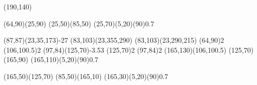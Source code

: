 \documentclass{standalone}
\begin{document}
\begin{axopicture}(190,140)

  \Line[arrow](64,90)(25,90)                               %
  \Line[arrow](25,50)(85,50)                               %
  \GOval(25,70)(5,20)(90){0.7}                             %
                                                           
  \PhotonArc(87,87)(23,35,173){-2}{7}                      %
  \Arc[arrow,clockwise,arrowpos=0.4](83,103)(23,355,290)   %
  \Arc[arrow,clockwise,arrowpos=0.4](83,103)(23,290,215)   %
  \Vertex(64,90){2}                                        %
  \Vertex(106,100.5){2}                                    %
  \Gluon(97,84)(125,70){-3.5}{3}                           %
  \Vertex(125,70){2}                                       %
  \Vertex(97,84){2}                                        %
  \Line[arrow](165,130)(106,100.5)                         %
  \Line[arrow](125,70)(165,90)                             %
  \GOval(165,110)(5,20)(90){0.7}                           %
                                                           
  \Line[arrow](165,50)(125,70)                             %
  \Line[arrow](85,50)(165,10)                              %
  \GOval(165,30)(5,20)(90){0.7}                            %
                                                           
\end{axopicture}
\end{document}
